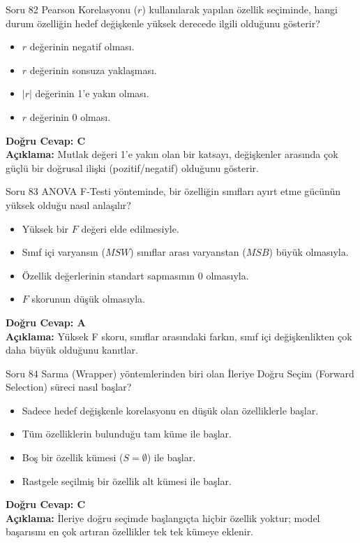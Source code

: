 \documentclass[12pt,a4paper]{article}
\begin{document}
\begin{testcard}{Soru 82}
    Pearson Korelasyonu ($r$) kullanılarak yapılan özellik seçiminde, hangi durum özelliğin hedef değişkenle yüksek derecede ilgili olduğunu gösterir?
    \begin{itemize}
        \item[A)] $r$ değerinin negatif olması.
        \item[B)] $r$ değerinin sonsuza yaklaşması.
        \item[C)] $|r|$ değerinin 1'e yakın olması.
        \item[D)] $r$ değerinin 0 olması.
    \end{itemize}
    \tcblower
    \textbf{Doğru Cevap: C} \\
    \textbf{Açıklama:} Mutlak değeri 1'e yakın olan bir katsayı, değişkenler arasında çok güçlü bir doğrusal ilişki (pozitif/negatif) olduğunu gösterir.
\end{testcard}

\begin{testcard}{Soru 83}
    ANOVA F-Testi yönteminde, bir özelliğin sınıfları ayırt etme gücünün yüksek olduğu nasıl anlaşılır?
    \begin{itemize}
        \item[A)] Yüksek bir $F$ değeri elde edilmesiyle.
        \item[B)] Sınıf içi varyansın ($MSW$) sınıflar arası varyanstan ($MSB$) büyük olmasıyla.
        \item[C)] Özellik değerlerinin standart sapmasının 0 olmasıyla.
        \item[D)] $F$ skorunun düşük olmasıyla.
    \end{itemize}
    \tcblower
    \textbf{Doğru Cevap: A} \\
    \textbf{Açıklama:} Yüksek F skoru, sınıflar arasındaki farkın, sınıf içi değişkenlikten çok daha büyük olduğunu kanıtlar.
\end{testcard}

\begin{testcard}{Soru 84}
    Sarma (Wrapper) yöntemlerinden biri olan İleriye Doğru Seçim (Forward Selection) süreci nasıl başlar?
    \begin{itemize}
        \item[A)] Sadece hedef değişkenle korelasyonu en düşük olan özelliklerle başlar.
        \item[B)] Tüm özelliklerin bulunduğu tam küme ile başlar.
        \item[C)] Boş bir özellik kümesi ($S = \emptyset$) ile başlar.
        \item[D)] Rastgele seçilmiş bir özellik alt kümesi ile başlar.
    \end{itemize}
    \tcblower
    \textbf{Doğru Cevap: C} \\
    \textbf{Açıklama:} İleriye doğru seçimde başlangıçta hiçbir özellik yoktur; model başarısını en çok artıran özellikler tek tek kümeye eklenir.
\end{testcard}
\end{document}
